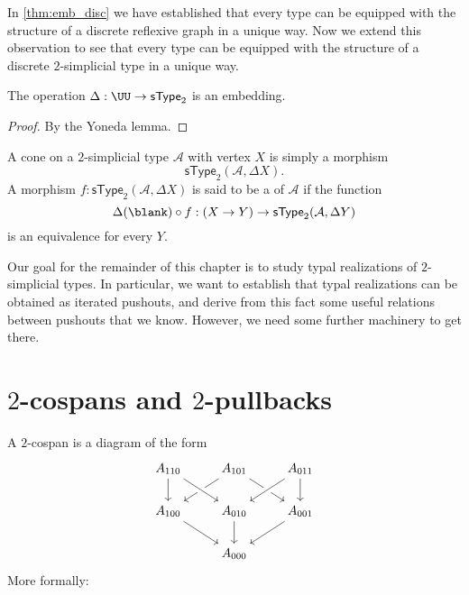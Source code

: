 In \cref{thm:emb_disc} we have established that every type can be equipped with the structure of a discrete reflexive graph in a unique way. Now we extend this observation to see that every type can be equipped with the structure of a discrete $2$-simplicial type in a unique way.

\begin{prp}\label{prp:2disc_emb}
The operation $\Delta:\UU\to \mathsf{sType}_2$ is an embedding.
\end{prp}

\begin{proof}
By the Yoneda lemma.
\end{proof}

\begin{defn}
A cone on a $2$-simplicial type $\mathcal{A}$ with vertex $X$ is simply a morphism
\begin{equation*}
\mathsf{sType}_2(\mathcal{A},\Delta X).
\end{equation*}
A morphism $f:\mathsf{sType}_2(\mathcal{A},\Delta X)$ is said to be a  of $\mathcal{A}$ if the function
\begin{equation*}
\Delta(\blank)\circ f : (X\to Y) \to \mathsf{sType}_2(\mathcal{A},\Delta Y)
\end{equation*}
is an equivalence for every $Y$. 
\end{defn}

Our goal for the remainder of this chapter is to study typal realizations of $2$-simplicial types. In particular, we want to establish that typal realizations can be obtained as iterated pushouts, and derive from this fact some useful relations between pushouts that we know. However, we need some further machinery to get there.

\section{\texorpdfstring{$2$}{2}-cospans and \texorpdfstring{$2$}{2}-pullbacks}

A $2$-cospan is a diagram of the form
\begin{equation*}
\begin{tikzcd}
A_{110} \arrow[d] & A_{101} \arrow[dl] \arrow[dr] & A_{011} \arrow[d] \\
A_{100} \arrow[dr] & A_{010} \arrow[d] \arrow[from=ul,crossing over] \arrow[from=ur,crossing over] & A_{001} \arrow[dl] \\
& A_{000}
\end{tikzcd}
\end{equation*}
More formally:

